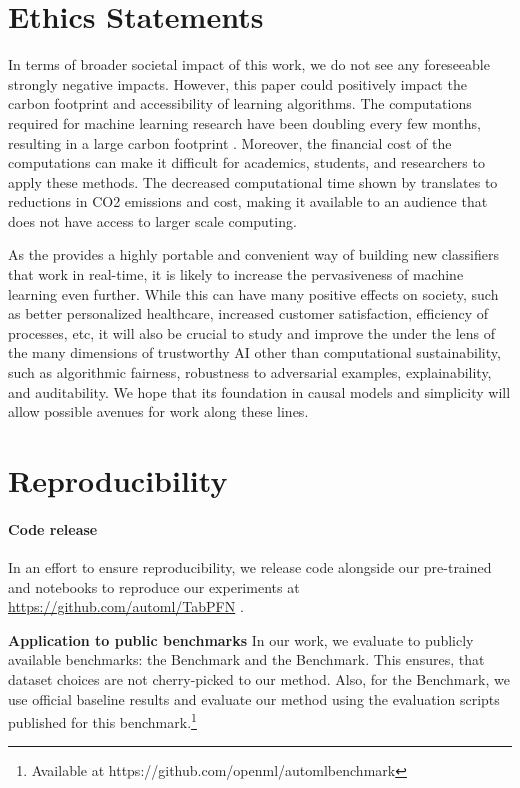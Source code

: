 \documentclass{article}
\begin{document}
\newpage

\section{Ethics Statements}
\label{sec:impacts}
In terms of broader societal impact of this work, we do not see any foreseeable strongly negative impacts.
However, this paper could positively impact the carbon footprint and accessibility of learning algorithms. The computations required for machine learning research have been doubling every few months, resulting in a large carbon footprint \citep{schwartz2020green}. Moreover, the financial cost of the computations can make it difficult for academics, students, and researchers to apply these methods.
The decreased computational time shown by \methodname{} translates to reductions in CO2 emissions and cost, making it available to an audience that does not have access to larger scale computing. 

As the \methodname{} provides a highly portable and convenient way of building new classifiers that work in real-time, it is likely to increase the pervasiveness of machine learning even further. While this can have many positive effects on society, such as better personalized healthcare, increased customer satisfaction, efficiency of processes, etc, it will also be crucial to study and improve the \methodname{} under the lens of the many dimensions of trustworthy AI other than computational sustainability, such as algorithmic fairness, robustness to adversarial examples, explainability, and auditability. We hope that its foundation in causal models and simplicity will allow possible avenues for work along these lines.

\section{Reproducibility}\label{sec:reproducibility}



\paragraph{Code release} In an effort to ensure reproducibility, we release code alongside our pre-trained \methodname{} and notebooks to reproduce our experiments at 
\url{https://github.com/automl/TabPFN}
.


\textbf{Application to public benchmarks} In our work, we evaluate \methodname{} to publicly available benchmarks: the \openmlcc{} Benchmark and the \openmlautoml{} Benchmark. This ensures, that dataset choices are not cherry-picked to our method. Also, for the \openmlautoml{} Benchmark, we use official baseline results and evaluate our method using the evaluation scripts published for this benchmark.\footnote{Available at https://github.com/openml/automlbenchmark}
\end{document}
